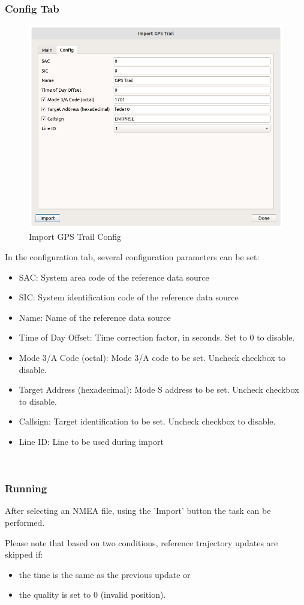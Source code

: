 \subsubsection{Config Tab}

\begin{figure}[H]
    \includegraphics[width=16cm]{figures/gps_import_config.png}
  \caption{Import GPS Trail Config}
\end{figure}

In the configuration tab, several configuration parameters can be set:

\begin{itemize}
\item SAC: System area code of the reference data source
\item SIC: System identification code of the reference data source
\item Name: Name of the reference data source
\item Time of Day Offset: Time correction factor, in seconds. Set to 0 to disable.
\item Mode 3/A Code (octal): Mode 3/A code to be set. Uncheck checkbox to disable.
\item Target Address (hexadecimal): Mode S address to be set. Uncheck checkbox to disable.
\item Callsign: Target identification to be set. Uncheck checkbox to disable.
\item Line ID: Line to be used during import
\end{itemize}
\ \\

\subsubsection{Running}

After selecting an NMEA file, using the 'Import' button the task can be performed.

Please note that based on two conditions, reference trajectory updates are skipped if:
\begin{itemize}
\item the time is the same as the previous update or
\item the quality is set to 0 (invalid position).
\end{itemize}
